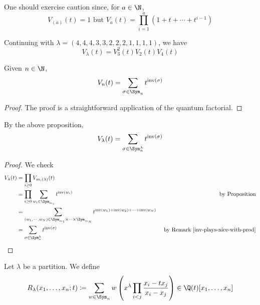 \documentclass[11pt,leqno,oneside]{amsart}
\numberwithin{thm}{section}
\newcommand{\inv}{\operatorname{inv}}
\newcommand{\defeq}{\coloneqq}
\begin{document}
\begin{rmk}
  One should exercise caution since, for \(a \in \N\), \[
    V_{(a)}(t) = 1 \text{ but }V_a(t) = \prod_{i=1}^a (1+t+\cdots+t^{i-1})
  \]
\end{rmk}
\begin{example}
  Continuing with \(\lambda = (4,4,4,3,3,2,2,2,1,1,1,1)\), we have \[
    V_\lambda(t) = V_3^2(t) V_2(t) V_4(t)
  \]
\end{example}
\begin{prop}
  Given \(n \in \N\), \[
    V_n(t) = \sum_{\sigma \in \Sym_n} t^{\inv(\sigma)}
  \]
\end{prop}
\begin{proof}
  The proof is a straightforward application of the quantum factorial.
\end{proof}
\begin{cor}
  By the above proposition, \[
    V_\lambda(t) = \sum_{\sigma \in \Sym_n^\lambda} t^{\inv(\sigma)}
  \]
\end{cor}
\begin{proof}
  We check
  \begin{align*}
    V_\lambda(t)
    & = \prod_{i \geq 0} V_{m_i(\lambda)}(t) \\
    & = \prod_{i \geq 0} \sum_{w_i \in \Sym_{m_i}} t^{\inv(w_i)}
    & \text{ by Proposition} \\
    & = \sum_{(w_1, \cdots, w_N) \in \Sym_{m_1} \times \cdots \times
      \Sym_{m_N}} 
      t^{\inv(w_1)+\inv(w_2)+\cdots + \inv(w_N)} \\
    & = \sum_{\sigma \in \Sym_n^\lambda} t^{\inv(\sigma)}
      & \text{ by Remark \ref{inv-plays-nice-with-prod}}
  \end{align*}
\end{proof}
\begin{defn}
  Let \(\lambda\) be a partition. We define \[
    R_\lambda(x_1,\ldots,x_n;t) \defeq \sum_{w \in \Sym_n} w\left(
      x^\lambda \prod_{i < j} \frac{x_i-tx_j}{x_i-x_j} \right) \in
    \Q(t)[x_1, \ldots, x_n]
  \]
\end{defn}
\end{document}

